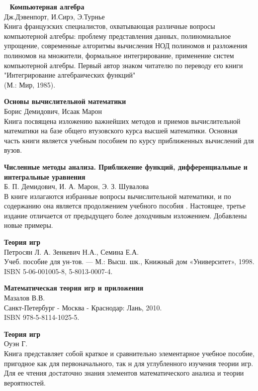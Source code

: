 \begin{thebibliography}{99}
\ 
\textbf{Компьютерная алгебра}\\
Дж.Дэвенпорт, И.Сирэ, Э.Турнье\\
Книга французских специалистов, охватывающая различные вопросы компьютерной
алгебры: проблему представления данных, полиномиальное упрощение, современные
алгоритмы вычисления НОД полиномов и разложения полиномов на множители,
формальное интегрирование, применение систем компьютерной алгебры. Первый автор
знаком читателю по переводу его книги "Интегрирование алгебраических функций"\\
(М.: Мир, 1985).


\textbf{Основы вычислительной математики}\\
Борис Демидович, Исаак Марон\\
Книга посвящена изложению важнейших методов и приемов вычислительной математики
на базе общего втузовского курса высшей математики. Основная часть книги
является учебным пособием по курсу приближенных вычислений для вузов.

\textbf{Численные методы анализа. Приближение функций, дифференциальные и
интегральные уравнения}\\
Б. П. Демидович, И. А. Марон, Э. З. Шувалова\\
В книге излагаются избранные вопросы вычислительной математики, и по содержанию
она является продолжением учебного пособия \cite{demacalc}.
Настоящее, третье издание отличается от предыдущего более доходчивым изложением.
Добавлены новые примеры.


\textbf{Теория игр}\\
Петросян Л. А. Зенкевич Н.А., Семина Е.А.\\
Учеб. пособие для ун-тов. — М.: Высш.
шк., Книжный дом «Университет», 1998.\\
ISBN 5-06-001005-8, 5-8013-0007-4.

\textbf{Математическая теория игр и приложения}\\
Мазалов В.В.\\
Санкт-Петербург - Москва - Краснодар: Лань, 2010.\\
ISBN 978-5-8114-1025-5.

\textbf{Теория игр}\\
Оуэн Г.\\
Книга представляет собой краткое и сравнительно элементарное учебное пособие,
пригодное как для первоначального, так н для углубленного изучения теории игр.
Для ее чтения достаточно знания элементов математического анализа и теории
вероятностей.


\end{thebibliography}
